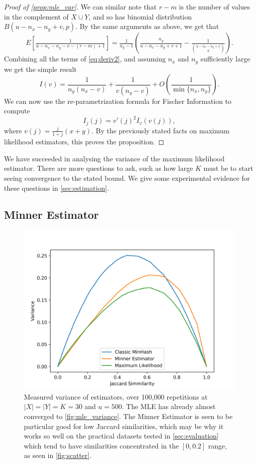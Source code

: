 \begin{proof}[Proof of \cref{prop:mle_var}]
   We can similar note that $r-m$ is the number of values in the complement of $X\cup Y$, and so has binomial distribution $B(u-n_x-n_y+v, p)$.
   By the same arguments as above, we get that
   \[
      E\left[\tfrac1{u-n_x-n_y-v-(r-m)+1}\right]
      = \tfrac1{n_y-1}\left(\tfrac{n_y}{u-n_x-n_y+v+1} - \tfrac1{\binom{u-n_x-n_y+v}{y}}\right).
   \]
   Combining all the terms of \cref{eq:deriv2}, and assuming $n_x$ and $n_y$ sufficiently large we get the simple result
   \[
   I(v)
   = \frac{1}{n_y(n_x-v)} + \frac1{v(n_y-v)} + O\left( \frac{1}{\min\{n_x,n_y\}} \right).
   \]
   We can now use the re-parametrization formula for Fischer Information to compute
   \[
      I_j(j) = v'(j)^{2}I_v(v(j)),
   \]
   where $v(j) = \frac{j}{1+j}(x+y)$.
   By the previously stated facts on maximum likelihood estimators, this proves the proposition.
\end{proof}

We have succeeded in analysing the variance of the maximum likelihood estimator.
There are more questions to ask, such as how large $K$ must be to start seeing convergence to the stated bound.
We give some experimental evidence for these questions in \cref{sec:estimation}.

\subsection{Minner Estimator}

\begin{figure}
   \includegraphics[trim=10 0 45 40,clip,width=\linewidth]{figures/synvar_100000.png}
   \caption{Measured variance of estimators, over 100,000 repetitions at $|X|=|Y|=K=30$ and $u=500$.
      The MLE has already almost converged to \cref{fig:mle_variance}.
      The Minner Estimator is seen to be particular good for low Jaccard similarities, which may be why it works so well on the practical datasets tested in \cref{sec:evaluation} which tend to have similarities concentrated in the $[0,0.2]$ range, as seen in \cref{fig:scatter}.}
   \label{fig:exp_variance}
\end{figure}

